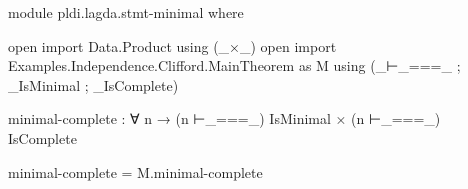 \begin{code}[hide]
module pldi.lagda.stmt-minimal where

open import Data.Product using (_×_)
open import Examples.Independence.Clifford.MainTheorem as M
  using (_⊢_===_ ; _IsMinimal ; _IsComplete)
\end{code}
\begin{code}[number=agda:minimal]
minimal-complete : ∀ {n} → (n ⊢_===_) IsMinimal × (n ⊢_===_) IsComplete
\end{code}
\begin{code}[hide]
minimal-complete = M.minimal-complete
\end{code}
